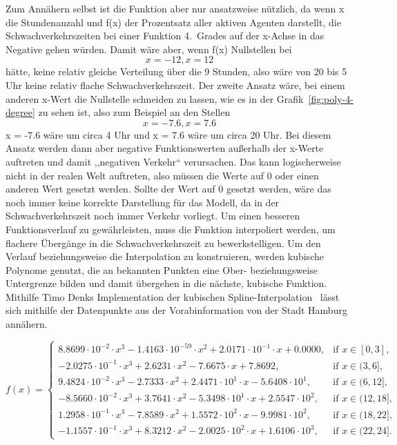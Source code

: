 Zum Annähern selbst ist die Funktion aber nur ansatzweise nützlich, da wenn x die Stundenanzahl und f(x) der Prozentsatz aller aktiven Agenten darstellt, die Schwachverkehrszeiten bei einer Funktion 4.\ Grades auf der x-Achse in das Negative gehen würden.
Damit wäre aber, wenn f(x) Nullstellen bei \[x = -12, x = 12\] hätte, keine relativ gleiche Verteilung über die 9 Stunden, also wäre von 20 bis 5 Uhr keine relativ flache Schwachverkehrszeit.
Der zweite Ansatz wäre, bei einem anderen x-Wert die Nullstelle schneiden zu lassen, wie es in der Grafik~\ref{fig:poly-4-degree} zu sehen ist, also zum Beispiel an den Stellen \[x = -7.6, x = 7.6\]
x = -7.6 wäre um circa 4 Uhr und x = 7.6 wäre um circa 20 Uhr.
Bei diesem Ansatz werden dann aber negative Funktionswerten außerhalb der x-Werte auftreten und damit ,,negativen Verkehr`` verursachen.
Das kann logischerweise nicht in der realen Welt auftreten, also müssen die Werte auf 0 oder einen anderen Wert gesetzt werden.
Sollte der Wert auf 0 gesetzt werden, wäre das noch immer keine korrekte Darstellung für das Modell, da in der Schwachverkehrszeit noch immer Verkehr vorliegt.
Um einen besseren Funktionsverlauf zu gewährleisten, muss die Funktion interpoliert werden, um flachere Übergänge in die Schwachverkehrszeit zu bewerkstelligen.
Um den Verlauf beziehungsweise die Interpolation zu konstruieren, werden kubische Polynome genutzt, die an bekannten Punkten eine Ober- beziehungsweise Untergrenze bilden und damit übergehen in die nächste, kubische Funktion.
Mithilfe Timo Denks Implementation der kubischen Spline-Interpolation~\cite{Denk2018} lässt sich mithilfe der Datenpunkte aus der Vorabinformation von der Stadt Hamburg annähern.


$f(x) = \begin{cases}
            8.8699 \cdot 10^{-2}\cdot x^3 -1.4163 \cdot 10^{-59}\cdot x^2 + 2.0171 \cdot 10^{-1}\cdot x + 0.0000, & \text{if } x \in [0,3], \\-2.0275 \cdot 10^{-1}\cdot x^3 + 2.6231\cdot x^2 -7.6675\cdot x + 7.8692, & \text{if } x \in (3,6], \\9.4824 \cdot 10^{-2}\cdot x^3 -2.7333\cdot x^2 + 2.4471 \cdot 10^{1}\cdot x -5.6408 \cdot 10^{1}, & \text{if } x \in (6,12], \\-8.5660 \cdot 10^{-2}\cdot x^3 + 3.7641\cdot x^2 -5.3498 \cdot 10^{1}\cdot x + 2.5547 \cdot 10^{2}, & \text{if } x \in (12,18], \\1.2958 \cdot 10^{-1}\cdot x^3 -7.8589\cdot x^2 + 1.5572 \cdot 10^{2}\cdot x -9.9981 \cdot 10^{2}, & \text{if } x \in (18,22], \\-1.1557 \cdot 10^{-1}\cdot x^3 + 8.3212\cdot x^2 -2.0025 \cdot 10^{2}\cdot x + 1.6106 \cdot 10^{3}, & \text{if } x \in (22,24].
            \label{fig:interpolation}
\end{cases}$

